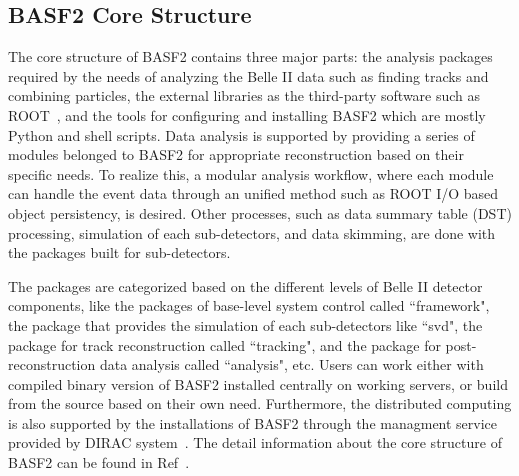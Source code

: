 
\subsection{BASF2 Core Structure}
The core structure of BASF2 contains three major parts: the analysis packages required by the needs of analyzing the Belle II data such as finding tracks and combining particles, the external libraries as the third-party software such as ROOT~\cite{ROOTcern}, and the tools for configuring and installing BASF2 which are mostly Python and shell scripts. Data analysis is supported by providing
a series of modules belonged to BASF2 for appropriate reconstruction based on their specific
needs. To realize this, a modular analysis workflow, where each module can handle the event
data through an unified method such as ROOT I/O based object persistency, is desired. Other
processes, such as data summary table (DST) processing, simulation of each sub-detectors, and data skimming, are done with the packages built for sub-detectors.

The packages are categorized based on the different levels of Belle II detector components, like the packages of base-level system control called ``framework", the package that provides the simulation of each sub-detectors like ``svd",  the package for track reconstruction called ``tracking",  and the package for post-reconstruction data analysis called ``analysis", etc. Users can work either with compiled binary version of BASF2 installed centrally on working servers, or build from the source based on their own need. Furthermore, the distributed computing is also supported by the installations of BASF2 through the managment service provided by DIRAC system~\cite{dirac}. The detail information about the core structure of BASF2 can be found in Ref~\cite{kuhr2019belle}. 





